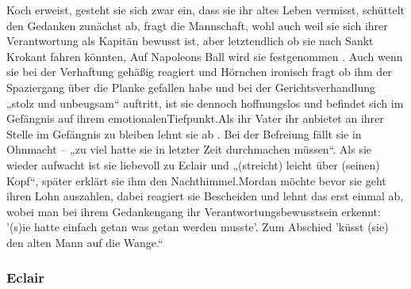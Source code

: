 {Koch erweist,\cite[S.218ff]{pir} gesteht sie sich zwar ein, dass sie ihr altes Leben vermisst, schüttelt den Gedanken 
zunächst ab,\cite[S.521f]{pir} fragt die Mannschaft, wohl auch weil sie sich ihrer Verantwortung als Kapitän bewusst ist, 
aber letztendlich ob sie nach Sankt Krokant fahren könnten,\cite[S.529]{pir} Auf Napoleons Ball wird sie festgenommen \cite[S.551]{pir}. 
Auch wenn sie bei der Verhaftung gehäßig reagiert und Hörnchen ironisch fragt ob ihm der Spaziergang über die Planke gefallen habe \cite[S.522]{pir} und bei der Gerichtsverhandlung „stolz und 
unbeugsam“ \cite[S.573]{pir} auftritt, ist sie dennoch hoffnungslos und befindet sich im Gefängnis auf ihrem emotionalenTiefpunkt.\cite[S.561]{pir}Als ihr Vater ihr anbietet an ihrer Stelle im Gefängnis zu bleiben lehnt sie ab \cite[S.562]{pir}. Bei der Befreiung fällt sie in Ohnmacht – „zu viel hatte sie in letzter Zeit durchmachen müssen“\cite[S.617]{pir}. Als sie wieder aufwacht ist sie liebevoll zu Eclair und „(streicht) leicht über (seinen) Kopf“, später erklärt sie ihm den Nachthimmel.\cite[S.631]{pir}Mordan möchte bevor sie geht ihren Lohn auszahlen, dabei reagiert sie Bescheiden und lehnt das erst einmal ab, wobei man bei ihrem Gedankengang ihr Verantwortungsbewusstsein  erkennt: \cite[S.638]{pir} '(s)ie hatte einfach getan was getan werden musste'.\cite[S.638]{pir} Zum Abschied 'küsst (sie) den alten Mann auf die Wange.“\cite[S.638]{pir}

\subsubsection{Eclair}

}
